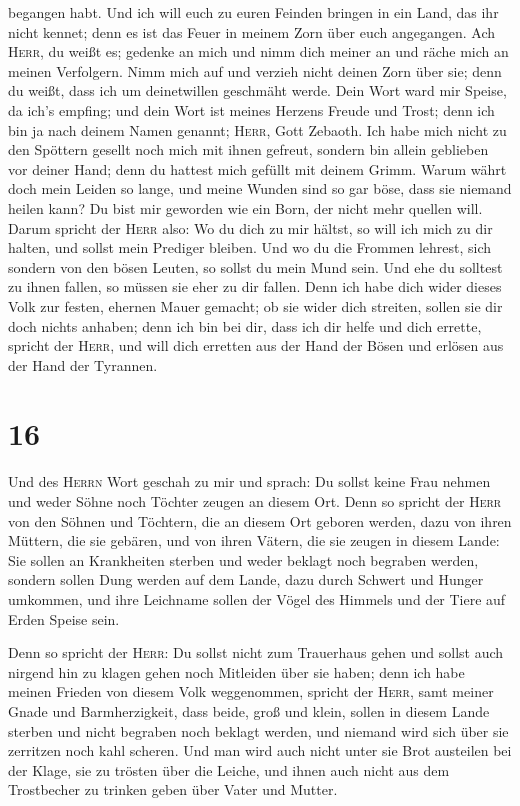 begangen habt.  Und ich will euch zu euren Feinden
bringen in ein Land, das ihr nicht kennet; denn es ist das Feuer in
meinem Zorn über euch angegangen.  Ach \textsc{Herr}, du
weißt es; gedenke an mich und nimm dich meiner an und räche mich an
meinen Verfolgern. Nimm mich auf und verzieh nicht deinen Zorn über sie;
denn du weißt, dass ich um deinetwillen geschmäht werde. 
Dein Wort ward mir Speise, da ich's empfing; und dein Wort ist meines
Herzens Freude und Trost; denn ich bin ja nach deinem Namen genannt;
\textsc{Herr}, Gott Zebaoth.  Ich habe mich nicht zu den
Spöttern gesellt noch mich mit ihnen gefreut, sondern bin allein
geblieben vor deiner Hand; denn du hattest mich gefüllt mit deinem
Grimm.  Warum währt doch mein Leiden so lange, und meine
Wunden sind so gar böse, dass sie niemand heilen kann? Du bist mir
geworden wie ein Born, der nicht mehr quellen will. 
Darum spricht der \textsc{Herr} also: Wo du dich zu mir hältst, so will
ich mich zu dir halten, und sollst mein Prediger bleiben. Und wo du die
Frommen lehrest, sich sondern von den bösen Leuten, so sollst du mein
Mund sein. Und ehe du solltest zu ihnen fallen, so müssen sie eher zu
dir fallen.  Denn ich habe dich wider dieses Volk zur
festen, ehernen Mauer gemacht; ob sie wider dich streiten, sollen sie
dir doch nichts anhaben; denn ich bin bei dir, dass ich dir helfe und
dich errette, spricht der \textsc{Herr},  und will dich
erretten aus der Hand der Bösen und erlösen aus der Hand der Tyrannen.

\hypertarget{section-15}{%
\section{16}\label{section-15}}

 Und des \textsc{Herrn} Wort geschah zu mir und sprach:
 Du sollst keine Frau nehmen und weder Söhne noch Töchter
zeugen an diesem Ort.  Denn so spricht der \textsc{Herr}
von den Söhnen und Töchtern, die an diesem Ort geboren werden, dazu von
ihren Müttern, die sie gebären, und von ihren Vätern, die sie zeugen in
diesem Lande:  Sie sollen an Krankheiten sterben und weder
beklagt noch begraben werden, sondern sollen Dung werden auf dem Lande,
dazu durch Schwert und Hunger umkommen, und ihre Leichname sollen der
Vögel des Himmels und der Tiere auf Erden Speise sein.

 Denn so spricht der \textsc{Herr}: Du sollst nicht zum
Trauerhaus gehen und sollst auch nirgend hin zu klagen gehen noch
Mitleiden über sie haben; denn ich habe meinen Frieden von diesem Volk
weggenommen, spricht der \textsc{Herr}, samt meiner Gnade und
Barmherzigkeit,  dass beide, groß und klein, sollen in
diesem Lande sterben und nicht begraben noch beklagt werden, und niemand
wird sich über sie zerritzen noch kahl scheren.  Und man
wird auch nicht unter sie Brot austeilen bei der Klage, sie zu trösten
über die Leiche, und ihnen auch nicht aus dem Trostbecher zu trinken
geben über Vater und Mutter.

